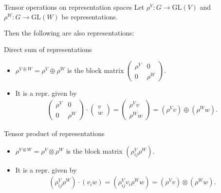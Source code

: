 \documentclass[handout, 10pt]{beamer}
\newcommand{\GL}{\text{GL}}
\begin{document}
	\begin{frame}{Tensor operations on representation spaces}
		Let $\rho^V: G \rightarrow \GL(V)$ and $\rho^W: G \rightarrow \GL(W)$ be representations. 
		
		
		Then the following are also representations:
		\vfill
		\begin{block}{Direct sum of representations}
			\begin{itemize}
				\item $\rho^{V \oplus W} = \rho^V \oplus \rho^W$ is the block matrix $\begin{pmatrix}
					\rho^V & 0 \\ 0 & \rho^W
				\end{pmatrix}$.
				
				\item It is a repr. given by 
				\begin{align*}
					\begin{pmatrix}
						\rho^V & 0 \\ 0 & \rho^W
					\end{pmatrix} \cdot \begin{pmatrix}
						v \\ w
					\end{pmatrix} 
					= \begin{pmatrix}
						\rho^V  v \\ \rho^W  w
					\end{pmatrix} 
					= (\rho^V v) \oplus (\rho^W w).
				\end{align*}
			\end{itemize}
		\end{block}
		
		\begin{block}{Tensor product of representations}
			\begin{itemize}
				\item $\rho^{V \otimes W} = \rho^V \otimes \rho^W$ is the block matrix $(\rho^V_{ij} \rho^W)$.
				
				\item It is a repr. given by 
				\begin{align*}
				(\rho^V_{ij} \rho^W) \cdot (v_i w)
					= (\rho^V_{ij}v_i \rho^Ww)
					= (\rho^V v) \otimes (\rho^W w).
				\end{align*}
			\end{itemize}
		\end{block}
	\end{frame}
	
\end{document}
